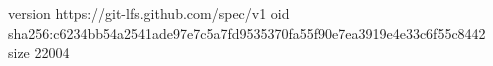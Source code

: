 version https://git-lfs.github.com/spec/v1
oid sha256:c6234bb54a2541ade97e7c5a7fd9535370fa55f90e7ea3919e4e33c6f55c8442
size 22004
